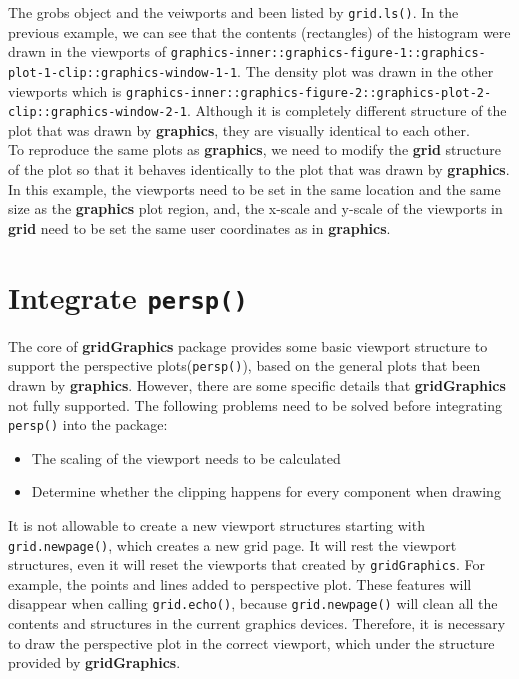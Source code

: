 \documentclass{report}
\begin{document}
The grobs object and the veiwports and been listed by \texttt{grid.ls()}. In the previous example, we can see that the contents (rectangles) of the histogram were drawn in the viewports of \texttt{graphics-inner::graphics-figure-1::graphics-plot-1-clip::graphics-window-1-1}. The density plot was drawn in the other viewports which is \texttt{graphics-inner::graphics-figure-2::graphics-plot-2-clip::graphics-window-2-1}. Although it is completely different structure of the plot that was drawn by \textbf{graphics}, they are visually identical to each other.\\

To reproduce the same plots as \textbf{graphics}, we need to modify the \textbf{grid} structure of the plot so that it behaves identically to the plot that was drawn by \textbf{graphics}. In this example, the viewports need to be set in the same location and the same size as the \textbf{graphics} plot region, and, the x-scale and y-scale of the viewports in \textbf{grid} need to be set the same user coordinates as in \textbf{graphics}.\\

\section{Integrate \texttt{persp()}}
The core of \textbf{gridGraphics} package provides some basic viewport structure to support the perspective plots(\texttt{persp()}), based on the general plots that been drawn by \textbf{graphics}. However, there are some specific details that \textbf{gridGraphics} not fully supported.
The following problems need to be solved before integrating \texttt{persp()} into the package:
\begin{itemize}
	\item{The scaling of the viewport needs to be calculated}
	\item{Determine whether the clipping happens for every component when drawing}
\end{itemize}

It is not allowable to create a new viewport structures starting with \texttt{grid.newpage()}, which creates a new grid page. It will rest the viewport structures, even it will reset the viewports that created by \texttt{gridGraphics}.
For example, the points and lines added to perspective plot. These features will disappear when calling \texttt{grid.echo()}, because \texttt{grid.newpage()} will clean all the contents and structures in the current graphics devices. Therefore, it is necessary to draw the perspective plot in the correct viewport, which under the structure provided by \textbf{gridGraphics}.\\
\end{document}
